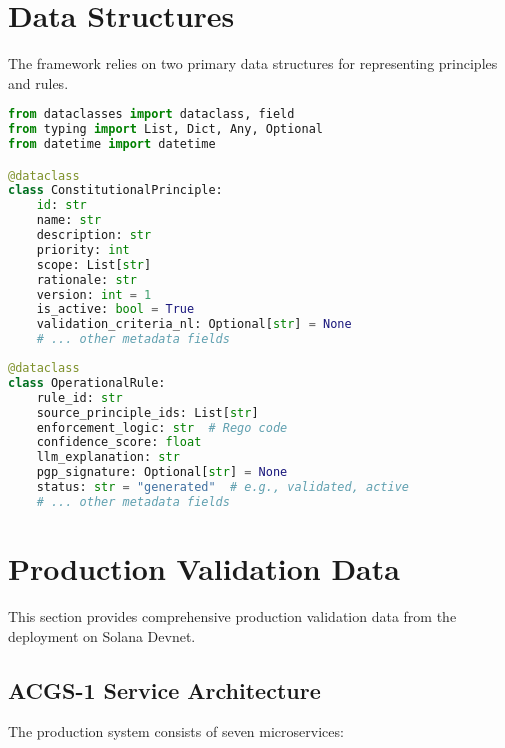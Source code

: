 \appendix

\section{Data Structures}\label{sec:appendix_datastructures}
The framework relies on two primary data structures for representing principles and rules.

\begin{lstlisting}[language=Python, caption={Python dataclass for a Constitutional Principle.}, label={lst:constitutional_principle}]
from dataclasses import dataclass, field
from typing import List, Dict, Any, Optional
from datetime import datetime

@dataclass
class ConstitutionalPrinciple:
    id: str
    name: str
    description: str
    priority: int
    scope: List[str]
    rationale: str
    version: int = 1
    is_active: bool = True
    validation_criteria_nl: Optional[str] = None
    # ... other metadata fields
\end{lstlisting}

\begin{lstlisting}[language=Python, caption={Python dataclass for an Operational Rule.}, label={lst:operational_rule}]
@dataclass
class OperationalRule:
    rule_id: str
    source_principle_ids: List[str]
    enforcement_logic: str  # Rego code
    confidence_score: float
    llm_explanation: str
    pgp_signature: Optional[str] = None
    status: str = "generated"  # e.g., validated, active
    # ... other metadata fields
\end{lstlisting}

\section{Production Validation Data}\label{sec:appendix_production}
This section provides comprehensive production validation data from the \quantumagi{} deployment on Solana Devnet.

\subsection{ACGS-1 Service Architecture}
The production system consists of seven microservices:

